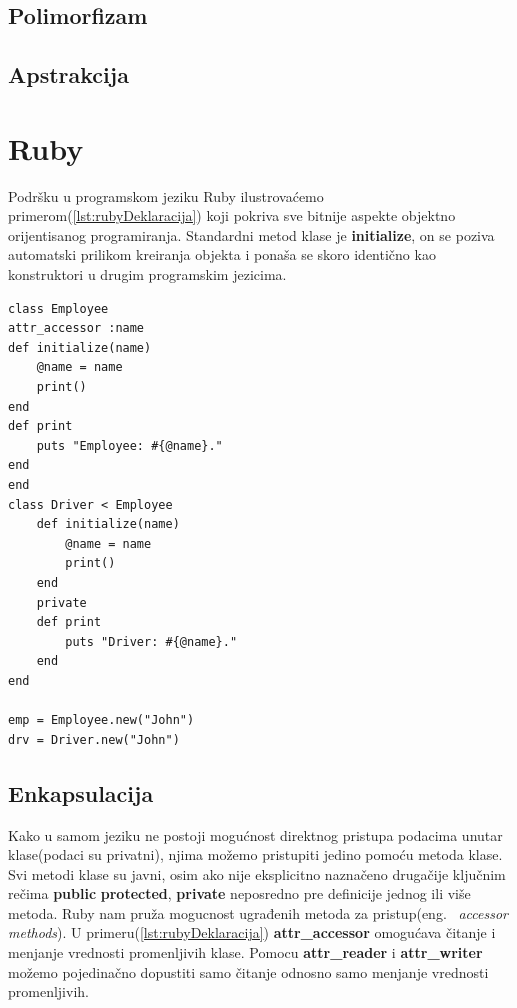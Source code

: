 \documentclass[a4paper]{article}
\begin{document}
{\subsection{Polimorfizam}
\label{subsec:adaPolimorfizam}

\subsection{Apstrakcija}
\label{subsec:adaApstrakcija}

\section{Ruby}
\label{sec:ruby}
 Podršku u programskom jeziku Ruby ilustrovaćemo primerom(\ref{lst:rubyDeklaracija}) koji pokriva sve bitnije aspekte objektno orijentisanog programiranja. Standardni metod klase je \textbf{initialize}, on se poziva automatski prilikom kreiranja objekta i ponaša se skoro identično kao konstruktori u drugim programskim jezicima.

\begin{lstlisting}[caption={Primer objektno orijentisanog programiranja u jeziku Ruby.},frame=single, label=lst:rubyDeklaracija]
class Employee
attr_accessor :name
def initialize(name)
	@name = name
	print()
end
def print
	puts "Employee: #{@name}."
end
end
class Driver < Employee
	def initialize(name)
		@name = name
		print()
	end
	private
	def print
		puts "Driver: #{@name}."
	end
end

emp = Employee.new("John")
drv = Driver.new("John")
\end{lstlisting}

\subsection{Enkapsulacija}
\label{subsec:rubyEnkapsulacija}
Kako u samom jeziku ne postoji mogućnost direktnog pristupa podacima unutar klase(podaci su privatni), njima možemo pristupiti jedino pomoću metoda klase. Svi metodi klase su javni, osim ako nije eksplicitno naznačeno drugačije ključnim rečima \textbf{public} \textbf{protected}, \textbf{private} neposredno pre definicije jednog ili više metoda. Ruby nam pruža mogucnost ugrađenih metoda za pristup(eng. ~{\em accessor methods}). U primeru(\ref{lst:rubyDeklaracija})  \textbf{attr\_accessor} omogućava čitanje i menjanje vrednosti promenljivih klase. Pomocu \textbf{attr\_reader} i \textbf{attr\_writer} možemo pojedinačno dopustiti samo čitanje odnosno samo menjanje vrednosti promenljivih.

}
\end{document}

